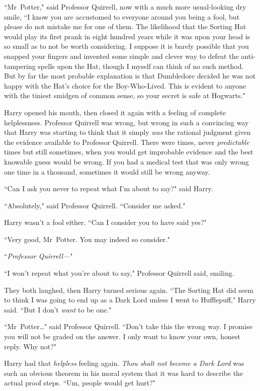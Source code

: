 ``Mr~Potter," said Professor Quirrell, now with a much more usual-looking dry smile, ``I know you are accustomed to everyone around you being a fool, but please do not mistake me for one of them. The likelihood that the Sorting Hat would play its first prank in eight hundred years while it was upon your head is so small as to not be worth considering. I suppose it is barely possible that you snapped your fingers and invented some simple and clever way to defeat the anti-tampering spells upon the Hat, though I myself can think of no such method. But by far the most probable explanation is that Dumbledore decided he was not happy with the Hat's choice for the Boy-Who-Lived. This is evident to anyone with the tiniest smidgen of common sense, so your secret is safe at Hogwarts."

Harry opened his mouth, then closed it again with a feeling of complete helplessness. Professor Quirrell was wrong, but wrong in such a convincing way that Harry was starting to think that it simply \emph{was} the rational judgment given the evidence available to Professor Quirrell. There were times, never \emph{predictable} times but still sometimes, when you would get improbable evidence and the best knowable guess would be wrong. If you had a medical test that was only wrong one time in a thousand, sometimes it would still be wrong anyway.

``Can I ask you never to repeat what I'm about to say?" said Harry.

``Absolutely," said Professor Quirrell. ``Consider me asked."

Harry wasn't a fool either. ``Can I consider you to have said yes?"

``Very good, Mr~Potter. You may indeed so consider."

``\emph{Professor Quirrell—}"

``I won't repeat what you're about to say," Professor Quirrell said, smiling.

They both laughed, then Harry turned serious again. ``The Sorting Hat did seem to think I was going to end up as a Dark Lord unless I went to Hufflepuff," Harry said. ``But I don't \emph{want} to be one."

``Mr~Potter{\ldots}" said Professor Quirrell. ``Don't take this the wrong way. I promise you will not be graded on the answer. I only want to know your own, honest reply. Why not?"

Harry had that \emph{helpless} feeling again. \emph{Thou shalt not become a Dark Lord} was such an obvious theorem in his moral system that it was hard to describe the actual proof steps. ``Um, people would get hurt?"

